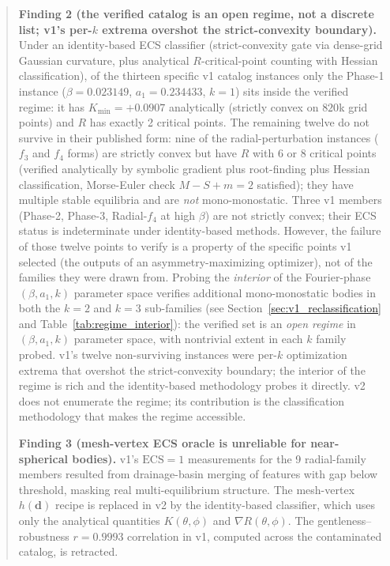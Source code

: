 \documentclass[11pt,a4paper]{article}
\begin{document}
\begin{abstract}
\textbf{Finding 2 (the verified catalog is an open regime, not a
discrete list; v1's per-$k$ extrema overshot the strict-convexity
boundary).} Under an identity-based ECS classifier (strict-convexity
gate via dense-grid Gaussian curvature, plus analytical
$R$-critical-point counting with Hessian classification), of the
thirteen specific v1 catalog instances only the Phase-1 instance
($\beta=0.023149$, $a_1=0.234433$, $k=1$) sits inside the verified
regime: it has $K_{\min}=+0.0907$ analytically (strictly convex on
$820$k grid points) and $R$ has exactly 2 critical points. The
remaining twelve do not survive in their published form: nine of
the radial-perturbation instances ($f_3$ and $f_4$ forms) are
strictly convex but have $R$ with 6 or 8 critical points (verified
analytically by symbolic gradient plus root-finding plus Hessian
classification, Morse-Euler check $M-S+m=2$ satisfied); they have
multiple stable equilibria and are \emph{not} mono-monostatic.
Three v1 members (Phase-2, Phase-3, Radial-$f_4$ at high $\beta$)
are not strictly convex; their ECS status is indeterminate under
identity-based methods. However, the failure of those twelve points
to verify is a property of the specific points v1 selected (the
outputs of an asymmetry-maximizing optimizer), not of the families
they were drawn from. Probing the \emph{interior} of the
Fourier-phase $(\beta, a_1, k)$ parameter space verifies additional
mono-monostatic bodies in both the $k=2$ and $k=3$ sub-families
(see Section~\ref{sec:v1_reclassification} and
Table~\ref{tab:regime_interior}): the verified set is an
\emph{open regime} in $(\beta, a_1, k)$ parameter space, with
nontrivial extent in each $k$ family probed. v1's twelve
non-surviving instances were per-$k$ optimization extrema that
overshot the strict-convexity boundary; the interior of the regime
is rich and the identity-based methodology probes it directly.
v2 does not enumerate the regime; its contribution is the
classification methodology that makes the regime accessible.

\textbf{Finding 3 (mesh-vertex ECS oracle is unreliable for
near-spherical bodies).} v1's $\mathrm{ECS}=1$ measurements for the
9 radial-family members resulted from drainage-basin merging
of features with gap below threshold, masking real multi-equilibrium
structure. The mesh-vertex $h(\mathbf{d})$ recipe is replaced in v2
by the identity-based classifier, which uses only the analytical
quantities $K(\theta,\phi)$ and $\nabla R(\theta,\phi)$. The
gentleness--robustness $r=0.9993$ correlation in v1, computed
across the contaminated catalog, is retracted.


\end{abstract}
\end{document}
